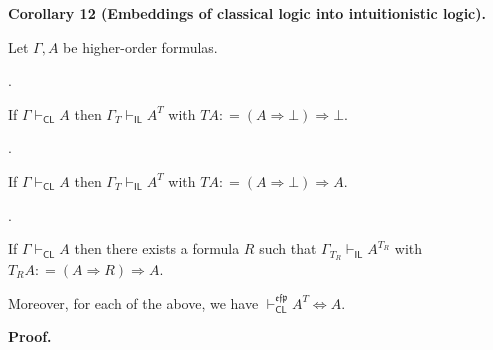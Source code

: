  
 
\par\medskip\noindent\textbf{Corollary 12 (Embeddings of classical logic into intuitionistic logic).}\par
 
 
Let $\Gamma,A$ be higher-order formulas.\par
  
\par{}. 
 
If $\Gamma\vdash_{\mathsf{CL}}A$ then $\Gamma_{T}\vdash_{\mathsf{IL}}A^{T}$ with $TA\mathrel{\mathop{:}}=(A\mathbin{\Rightarrow}\bot)\mathbin{\Rightarrow}\bot$.\par
 
 
 
\par{}. 
 
If $\Gamma\vdash_{\mathsf{CL}}A$ then $\Gamma_{T}\vdash_{\mathsf{IL}}A^{T}$ with $TA\mathrel{\mathop{:}}=(A\mathbin{\Rightarrow}\bot)\mathbin{\Rightarrow}A$.\par
 
 
 
\par{}. 
 
If $\Gamma\vdash_{\mathsf{CL}}A$ then there exists a formula $R$ such that $\Gamma_{T_{R}}\vdash_{\mathsf{IL}}A^{T_{R}}$ with $T_{R}A\mathrel{\mathop{:}}=(A\mathbin{\Rightarrow}R)\mathbin{\Rightarrow}A$.\par
 
 
  
Moreover, for each of the above, we have $\vdash_{\mathsf{CL}}^{\mathfrak{e}\mathfrak{f}\mathfrak{p}}A^{T}\Leftrightarrow
A$.\par
 
 
 
 
\par\medskip\noindent\textbf{Proof.}\par
 
 
